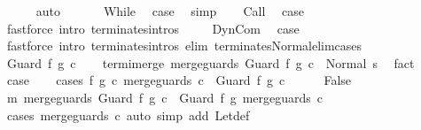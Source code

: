 \begin{isabellebody}
\ \ \ \ \isamarkupfalse%
\ auto\isanewline
\ \ \isacommand{{\isacharbraceright}}\isamarkupfalse%
\isanewline
\ \ \isamarkupfalse%
\ While\ \isamarkupfalse%
\ {\isacharquery}case\ \isamarkupfalse%
\ simp\isanewline
{}\isamarkupfalse%
\isanewline
\ \ \isamarkupfalse%
\ Call\ \isamarkupfalse%
\ {\isacharquery}case\ \isanewline
\ \ \ \ \isamarkupfalse%
\ {\isacharparenleft}fastforce\ intro{\isacharcolon}\ terminates{\isachardot}intros\ {\isacharparenright}\isanewline
{}\isamarkupfalse%
\isanewline
\ \ \isamarkupfalse%
\ DynCom\ \isamarkupfalse%
\ {\isacharquery}case\ \isanewline
\ \ \ \ \isamarkupfalse%
\ {\isacharparenleft}fastforce\ intro{\isacharcolon}\ terminates{\isachardot}intros\ elim{\isacharcolon}\ terminates{\isacharunderscore}Normal{\isacharunderscore}elim{\isacharunderscore}cases{\isacharparenright}\isanewline
{}\isamarkupfalse%
\isanewline
\ \ \isamarkupfalse%
\ {\isacharparenleft}Guard\ f\ g\ c{\isacharparenright}\isanewline
\ \ \isamarkupfalse%
\ termi{\isacharunderscore}merge{\isacharcolon}\ {\isachardoublequoteopen}{\isasymGamma}{\isasymturnstile}merge{\isacharunderscore}guards\ {\isacharparenleft}Guard\ f\ g\ c{\isacharparenright}\ {\isasymdown}\ Normal\ s{\isachardoublequoteclose}\ \isamarkupfalse%
\ fact\isanewline
\ \ \isamarkupfalse%
\ {\isacharquery}case\isanewline
\ \ \isamarkupfalse%
\ {\isacharparenleft}cases\ {\isachardoublequoteopen}{\isasymexists}f{\isacharprime}\ g{\isacharprime}\ c{\isacharprime}{\isachardot}\ merge{\isacharunderscore}guards\ c\ {\isacharequal}\ Guard\ f{\isacharprime}\ g{\isacharprime}\ c{\isacharprime}{\isachardoublequoteclose}{\isacharparenright}\isanewline
\ \ \ \ \isamarkupfalse%
\ False\isanewline
\ \ \ \ \isamarkupfalse%
\ m{\isacharcolon}\ {\isachardoublequoteopen}merge{\isacharunderscore}guards\ {\isacharparenleft}Guard\ f\ g\ c{\isacharparenright}\ {\isacharequal}\ Guard\ f\ g\ {\isacharparenleft}merge{\isacharunderscore}guards\ c{\isacharparenright}{\isachardoublequoteclose}\isanewline
\ \ \ \ \ \ \isamarkupfalse%
\ {\isacharparenleft}cases\ {\isachardoublequoteopen}merge{\isacharunderscore}guards\ c{\isachardoublequoteclose}{\isacharparenright}\ {\isacharparenleft}auto\ simp\ add{\isacharcolon}\ Let{\isacharunderscore}def{\isacharparenright}\isanewline
\ \ \ \ \isamarkupfalse%

\end{isabellebody}
